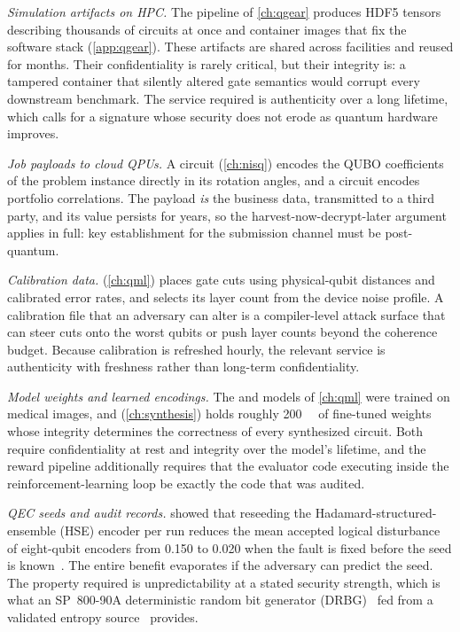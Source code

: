 \emph{Simulation artifacts on HPC.} The \qgear{} pipeline of \cref{ch:qgear} produces HDF5 tensors describing thousands of circuits at once and container images that fix the software stack (\cref{app:qgear}). These artifacts are shared across facilities and reused for months. Their confidentiality is rarely critical, but their integrity is: a tampered container that silently altered gate semantics would corrupt every downstream benchmark. The service required is authenticity over a long lifetime, which calls for a signature whose security does not erode as quantum hardware improves.

\emph{Job payloads to cloud QPUs.} A \deal{} circuit (\cref{ch:nisq}) encodes the QUBO coefficients of the problem instance directly in its rotation angles, and a \qawa{} circuit encodes portfolio correlations. The payload \emph{is} the business data, transmitted to a third party, and its value persists for years, so the harvest-now-decrypt-later argument applies in full: key establishment for the submission channel must be post-quantum.

\emph{Calibration data.} \shardq{} (\cref{ch:qml}) places gate cuts using physical-qubit distances and calibrated error rates, and \deal{} selects its layer count from the device noise profile. A calibration file that an adversary can alter is a compiler-level attack surface that can steer cuts onto the worst qubits or push layer counts beyond the coherence budget. Because calibration is refreshed hourly, the relevant service is authenticity with freshness rather than long-term confidentiality.

\emph{Model weights and learned encodings.} The \qpie{} and \vqt{} models of \cref{ch:qml} were trained on medical images, and \rubriq{} (\cref{ch:synthesis}) holds roughly \SI{200}{\giga\byte} of fine-tuned weights whose integrity determines the correctness of every synthesized circuit. Both require confidentiality at rest and integrity over the model's lifetime, and the \rubriq{} reward pipeline additionally requires that the evaluator code executing inside the reinforcement-learning loop be exactly the code that was audited.

\emph{QEC seeds and audit records.}  showed that reseeding the Hadamard-structured-ensemble (HSE) encoder per run reduces the mean accepted logical disturbance of eight-qubit encoders from 0.150 to 0.020 when the fault is fixed before the seed is known~\cite{guo2026qecaudit}. The entire benefit evaporates if the adversary can predict the seed. The property required is unpredictability at a stated security strength, which is what an SP~800-90A deterministic random bit generator (DRBG)~\cite{nist2015sp80090a} fed from a validated entropy source~\cite{nist2018sp80090b} provides.

